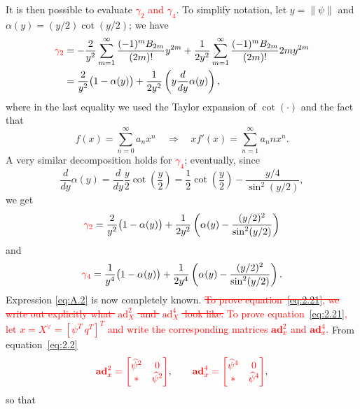 \documentclass[11pt]{article}
\newcommand{\rev}[1]{\textcolor{red}{#1}}
\newcommand{\del}[1]{\textcolor{red}{\sout{#1}}}
\newcommand{\bad}{\mathbf{ad}}
\newcommand{\ad}{\operatorname{ad}}
\begin{document}
It is then possible to evaluate \rev{$\gamma_2$ and $\gamma_4$}. To simplify notation, let $y=\|\psi\|$ and $\alpha(y)=(y/2)\cot(y/2)$; we have
\begin{align*}
\rev{\gamma_2}
&=-\frac{2}{y^2}\sum_{m=1}^{\infty}\frac{(-1)^mB_{2m}}{(2m)!}y^{2m}
+\frac{1}{2y^2}\sum_{m=1}^{\infty}\frac{(-1)^mB_{2m}}{(2m)!}2m y^{2m}\\
&=\frac{2}{y^2}\bigl(1-\alpha(y)\bigr)
+\frac{1}{2y^2}\left(y\frac{d}{dy}\alpha(y)\right),
\end{align*}
where in the last equality we used the Taylor expansion of $\cot(\cdot)$ and the fact that
\begin{equation*}
f(x)=\sum_{n=0}^{\infty}a_nx^n\quad\Rightarrow\quad xf'(x)=\sum_{n=1}^{\infty}a_nnx^n.
\end{equation*}
A very similar decomposition holds for \rev{$\gamma_4$}; eventually, since
\begin{equation*}
\frac{d}{dy}\alpha(y)=\frac{d}{dy}\frac y2\cot\left(\frac y2\right)
=\frac12\cot\left(\frac y2\right)-\frac{y/4}{\sin^2(y/2)},
\end{equation*}
we get
\begin{equation*}
\rev{\gamma_2}=\frac{2}{y^2}\bigl(1-\alpha(y)\bigr)
+\frac{1}{2y^2}\left(\alpha(y)-\frac{(y/2)^2}{\sin^2(y/2)}\right)
\end{equation*}
and
\begin{equation*}
\rev{\gamma_4}=\frac{1}{y^4}\bigl(1-\alpha(y)\bigr)
+\frac{1}{2y^4}\left(\alpha(y)-\frac{(y/2)^2}{\sin^2(y/2)}\right).
\end{equation*}
Expression \eqref{eq:A.2} is now completely known. \del{To prove equation~\eqref{eq:2.21}, we write out explicitly what $\ad_X^2$ and $\ad_X^4$ look like.} \rev{To prove equation~\eqref{eq:2.21}, let $x=X^\vee=[\psi^T\ q^T]^T$ and write the corresponding matrices $\bad_x^2$ and $\bad_x^4$.} From equation~\eqref{eq:2.2}
\begin{equation*}
\rev{\bad_x^2=\begin{bmatrix}\widehat\psi^2&0\\ *&\widehat\psi^2\end{bmatrix}},
\qquad
\rev{\bad_x^4=\begin{bmatrix}\widehat\psi^4&0\\ *&\widehat\psi^4\end{bmatrix}},
\end{equation*}
so that
\end{document}
